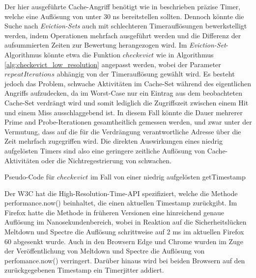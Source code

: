 Der hier ausgeführte Cache-Angriff benötigt wie in beschrieben präzise Timer, welche eine Auflösung von unter 30 ns bereitstellen sollten. Dennoch könnte die Suche nach \textit{Eviction-Sets} auch mit schlechteren Timerauflösungen bewerkstelligt werden, indem Operationen mehrfach ausgeführt werden und die Differenz der aufsummierten Zeiten zur Bewertung herangezogen wird.
Im \textit{Eviction-Set}-Algorithmus könnte etwa die Funktion $checkevict$ wie in Algorithmus \ref{alg:checkevict_low_resolution} angepasst werden, wobei der Parameter $repeatIterations$ abhängig von der Timerauflösung gewählt wird. 
Es besteht jedoch das Problem, schwache Aktivitäten im Cache-Set während des eigentlichen Angriffs aufzudecken, da im Worst-Case nur ein Eintrag aus dem beobachteten Cache-Set verdrängt wird und somit lediglich die Zugriffszeit zwischen einem Hit und einem Miss ausschlaggebend ist. 
In diesem Fall könnte die Dauer mehrerer Prime and Probe-Iterationen gesamtheitlich gemessen werden, und zwar unter der Vermutung, dass auf die für die Verdrängung verantwortliche Adresse über die Zeit mehrfach zugegriffen wird. %
Die direkten Auswirkungen eines niedrig aufgelösten Timers sind also eine geringere zeitliche Auflösung von Cache-Aktivitäten oder die Nichtregestrierung von schwachen.

\begin{algorithm}[h]
\DontPrintSemicolon
\caption{Pseudo-Code für $checkevict$ im Fall von einer niedrig aufgelösten getTimestamp}
\label{alg:checkevict_low_resolution}


\end{algorithm}

Der W3C hat die High-Resolution-Time-API spezifiziert, welche die Methode performance.now() beinhaltet, die einen aktuellen Timestamp zurückgibt. Im Firefox hatte die Methode in früheren Versionen eine hinreichend genaue Auflösung im Nanosekundenbereich, wobei in Reaktion auf die Sicherheitslücken Meltdown und Spectre die Auflösung schrittweise auf 2 ms im aktuellen Firefox 60 abgesenkt wurde. 
Auch in den Browsern Edge und Chrome wurden im Zuge der Veröffentlichung von Meltdown und Spectre die Auflösung von perfomance.now() verringert.
Darüber hinaus wird bei beiden Browsern auf den zurückgegebenen Timestamp ein Timerjitter addiert.

